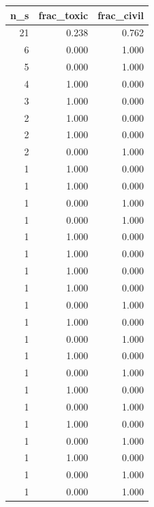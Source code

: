 \begin{tabular}{rrr}
\toprule
n_s & frac_toxic & frac_civil \\
\midrule
21 & 0.238 & 0.762 \\
6 & 0.000 & 1.000 \\
5 & 0.000 & 1.000 \\
4 & 1.000 & 0.000 \\
3 & 1.000 & 0.000 \\
2 & 1.000 & 0.000 \\
2 & 1.000 & 0.000 \\
2 & 0.000 & 1.000 \\
1 & 1.000 & 0.000 \\
1 & 1.000 & 0.000 \\
1 & 0.000 & 1.000 \\
1 & 0.000 & 1.000 \\
1 & 1.000 & 0.000 \\
1 & 1.000 & 0.000 \\
1 & 1.000 & 0.000 \\
1 & 1.000 & 0.000 \\
1 & 0.000 & 1.000 \\
1 & 1.000 & 0.000 \\
1 & 0.000 & 1.000 \\
1 & 1.000 & 0.000 \\
1 & 0.000 & 1.000 \\
1 & 1.000 & 0.000 \\
1 & 0.000 & 1.000 \\
1 & 1.000 & 0.000 \\
1 & 0.000 & 1.000 \\
1 & 1.000 & 0.000 \\
1 & 0.000 & 1.000 \\
1 & 0.000 & 1.000 \\
\bottomrule
\end{tabular}
